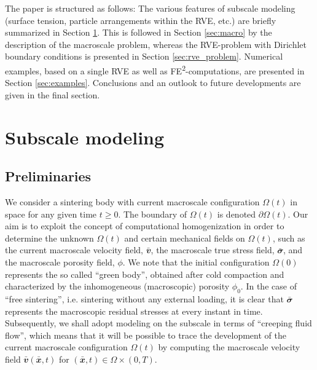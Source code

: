 \documentclass[10pt,a4paper]{article}
\renewcommand{\ta}[1]{\mathbfit{#1}}
\renewcommand{\ts}[1]{\mathbfit{#1}}
\begin{document}
The paper is structured as follows:
The various features of subscale modeling (surface tension, particle arrangements within the RVE, etc.) are briefly summarized in Section \ref{sec:subscale}. This is followed in Section \ref{sec:macro} by the description of the macroscale problem, whereas the RVE-problem with Dirichlet boundary conditions is presented in Section \ref{sec:rve_problem}. Numerical examples, based on a single RVE as well as FE\textsuperscript{2}-computations, are presented in Section \ref{sec:examples}. Conclusions and an outlook to future developments are given in the final section.


\section{Subscale modeling}\label{sec:subscale}

\subsection{Preliminaries}

We consider a sintering body with current macroscale configuration $\Omega(t)$ in space for any given time $t\geq 0$. The boundary of $\Omega(t)$ is denoted $\partial\Omega(t)$. Our aim is to exploit the concept of computational homogenization in order to determine the unknown $\Omega(t)$ and certain mechanical fields on $\Omega(t)$, such as the current macroscale velocity field, $\bar{\ts v}$, the macroscale true stress field, $\bar{\ts\sigma}$, and the macroscale porosity field, $\phi$. We note that the initial configuration $\Omega(0)$ represents the so called ``green body'', obtained after cold compaction and characterized by the inhomogeneous (macroscopic) porosity $\phi_0$. In the case of ``free sintering'', i.e. sintering without any external loading, it is clear that $\bar{\ts\sigma}$ represents the macroscopic residual stresses at every instant in time. Subsequently, we shall adopt modeling on the subscale in terms of ``creeping fluid flow'', which means that it will be possible to trace the development of the current macroscale configuration $\Omega(t)$ by computing  the macroscale velocity field $\bar{\ta v}(\bar{\ta x},t)$ for $(\bar{\ta x},t)\in\Omega\times(0,T)$.
\end{document}
